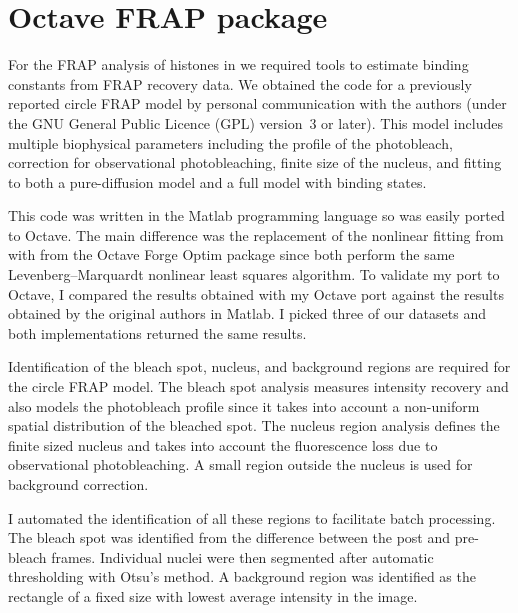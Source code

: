 \section{Octave FRAP package}
\label{sec:software:octave-frap}

For the FRAP analysis of histones
in  we required tools to estimate
binding constants from FRAP recovery data.  We obtained the code for a
previously reported circle FRAP model \citep{mcnally-frap-code} by
personal communication with the authors (under the GNU General Public
Licence (GPL) version~3 or later).  This model includes multiple
biophysical parameters including the profile of the photobleach, correction
for observational photobleaching, finite size of the nucleus, and
fitting to both a pure-diffusion model and a full model with binding
states.

This code was written in the Matlab programming language so was
easily ported to Octave.  The main difference was the replacement of
the nonlinear fitting from  with 
from the Octave Forge Optim package since both perform the same
Levenberg--Marquardt nonlinear least squares algorithm.
To validate my port to Octave, I compared the results obtained with
my Octave port against the results obtained by the original authors
in Matlab.  I picked three of our datasets and both implementations
returned the same results.

Identification of the bleach spot, nucleus, and background regions are
required for the circle FRAP model.  The bleach spot analysis measures
intensity recovery and also models the photobleach profile since it
takes into account a non-uniform spatial distribution of the bleached
spot.  The nucleus region analysis defines the finite sized nucleus and takes
into account the fluorescence loss due to observational
photobleaching.  A small region outside the nucleus is used for
background correction.

I automated the identification of all these regions to facilitate
batch processing.  The bleach spot was
identified from the difference between the post and pre-bleach frames.
Individual nuclei were then segmented after automatic thresholding with Otsu's
method.  A background region was identified as the rectangle of a
fixed size with lowest average intensity in the image.

